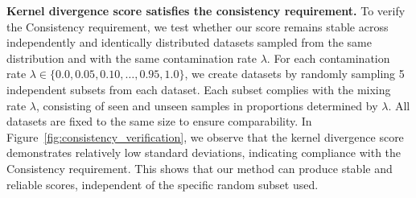 
\textbf{Kernel divergence score satisfies the consistency requirement.}
To verify the Consistency requirement, we test whether our score remains stable across independently and identically distributed datasets sampled from the same distribution and with the same contamination rate $\lambda$.
For each contamination rate $\lambda \in \{0.0, 0.05, 0.10, \ldots, 0.95, 1.0\}$, we create datasets by randomly sampling 5 independent subsets from each dataset.
Each subset complies with the mixing rate $\lambda$, consisting of seen and unseen samples in proportions determined by $\lambda$. 
All datasets are fixed to the same size to ensure comparability. 
In Figure~\ref{fig:consistency_verification}, we observe that the kernel divergence score demonstrates relatively low standard deviations, indicating compliance with the Consistency requirement. 
This shows that our method can produce stable and reliable scores, independent of the specific random subset used.

